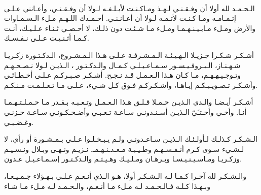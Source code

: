 \ \vfill{}
\begin{center}
    {
        \Large\bfseries
    }
\end{center}

\begin{RLtext}
    الـحـمـد لله أولا أن وفـقـنـي لـهـذ ومـاكـنـت لأبـلـغـه لـولا أن وفـقـنـي،
    وأعـانني عـلـى إتـمـامـه ومـا كـنـت لأتـمـه لـولا أن أعـانـنـي.
    أحـمـدك اللـهـم مـلء الـسـمـاوات والأرض ومـلء مـابـيـنـهـمـا ومـلء مـا شـئـت دون ذلـك،
    لا أحـصـي ثـنـاء عـلـيـك، أنـت كـمـا أثـنـيـت عـلـى نـفـسـك.
    
    أشـكـر شـكـرا جـزيـلا الـهـيـئـة الـمـشـرفـة عـلـى هـذا الـمـشـروع،
    الـدكـتـورة زكـريـا شـهـنـاز، الـبـروفـيـسـور سـمـاعـيـلـي كـمـال والـدكـتـور ،
    الـذيـن لـولا نـصـحـهـم وتـوجـيـهـهـم، مـا كـان هـذا الـعـمـل قـد نـجـح.
    أشـكـر صـبـركـم عـلـى أخـطـائـي وأشـكـر تـصـويـبـكـم إيـاهـا،
    وأشـكـركـم فـوق كـل شـيء، عـلـى مـا تـعـلـمـت مـنـكـم.
    
    أشـكـر أيـضـا والـدي الـذيـن حـمـلا قـلـق هـذا الـعـمـل وتـعـبـه بـقـدر مـا حـمـلـتـهـمـا أنـا.
    وأخـي وأخـتـَيّ الـذيـن أسـنـدونـي سـاعـة تـعـبـي وأضـحـكـونـي سـاعـة حـزنـي وغـضـبـي.
    
    الـشـكـر كـذلـك لـأولـئـك الـذيـن سـاعـدونـي ولـم يـبـخـلـوا عـلـي بـمـشـورة أو رأي، 
    لا لـشـيء سـوى كـرم أنـفـسـهـم وطـيـبـة مـعـدـنـهـمـ.
    نـزيـم ونـهـى وبـلال ونـسـيـم وزكـريـا ومـاسـيـنـيـسـا وبـرهـان ومـلـيـك وهـيـثـم والـدكـتـور إسـمـاعـيـل عـدون.
    
    والـشـكـر لله آخـرا كـمـا لـه الـشـكـر أولا، 
    هـو الـذي أنـعـم عـلـي بـهـؤلاء جـمـيـعـا، وبـهـذا كـلـه
    فـالـحـمـد لـه مـلء مـا أنـعـم، والـحـمـد لـه مـلء مـا شـاء
\end{RLtext}
\vfill{}